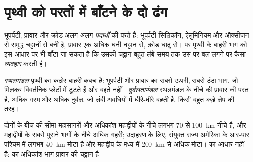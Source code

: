 \section{पृथ्वी को परतों में बाँटने के दो ढंग}

भूपर्पटी, प्रावार और क्रोड अलग-अलग
\emph{पदार्थों} की परतें हैं: भूपर्पटी सिलिकॉन, ऐलुमिनियम और
ऑक्सीजन से समृद्ध चट्टानों से बनी है, प्रावार एक अधिक घनी चट्टान से, क्रोड धातु से। पर
पृथ्वी के बाहरी भाग को इस आधार पर भी बाँटा जा सकता है कि उसकी चट्टान बहुत लंबे समय तक
उस पर बल लगने पर कैसा \emph{व्यवहार} करती है।

\begin{definition}\label{def:g11:lithosphere-asthenosphere:lithosphere}
\emph{स्थलमंडल} पृथ्वी का कठोर बाहरी
कवच है: भूपर्पटी और प्रावार का सबसे ऊपरी, सबसे ठंडा भाग, जो मिलकर
विवर्तनिक प्लेटों में टूटते हैं और बहते नहीं। \emph{दुर्बलतामंडल}
स्थलमंडल के नीचे की प्रावार की परत है, अधिक गरम और अधिक दुर्बल, जो लंबी
अवधियों में धीरे-धीरे बहती है, किसी बहुत कड़े लेप की तरह।
\end{definition}

दोनों के बीच की सीमा महासागरों और अधिकांश महाद्वीपों के नीचे लगभग 70 से \qty{100}{km} नीचे है,
और महाद्वीपों के सबसे पुराने भागों के नीचे अधिक गहरी; उदाहरण के लिए, संयुक्त राज्य अमेरिका के आर-पार
 पश्चिम में लगभग \qty{40}{km} मोटा है और महाद्वीप के मध्य में
\qty{200}{km} से अधिक मोटा।  का आधार  नहीं है:
 का अधिकांश भाग प्रावार की चट्टान है।

